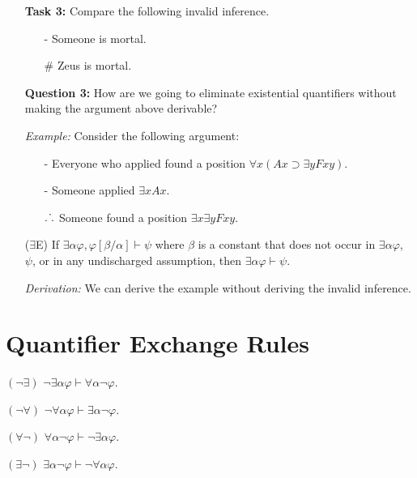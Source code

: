 \documentclass[a4paper, 11pt]{article} %
\def\therefore{\ensuremath{\ldotp\dot\,\ldotp}}
\newcommand{\qt}[2]{#1 #2} %
\newcommand{\unisub}[2]{[#1/#2]}
\begin{document}
\begin{enumerate}
  \item[\bf Task 3:] Compare the following invalid inference.
    \begin{itemize}
      \item[-] Someone is mortal.
      \item[$\#$] Zeus is mortal.
    \end{itemize}
  \item[\bf Question 3:] How are we going to eliminate existential quantifiers without making the argument above derivable?
  \item[\it Example:] Consider the following argument:
    \begin{itemize}
      \item[-] Everyone who applied found a position $\forall x(Ax \supset \exists y Fxy)$.
      \item[-] Someone applied $\exists xAx$.
      \item[$\therefore$] Someone found a position $\exists x\exists y Fxy$.
    \end{itemize}
  \item[($\exists$E)] If $\exists\alpha\varphi,\varphi\unisub{\beta}{\alpha} \vdash \psi$ where $\beta$ is a constant that does not occur in $\exists\alpha\varphi$, $\psi$, or in any undischarged assumption, then $\exists\alpha\varphi\vdash \psi$.
  \item[\it Derivation:] We can derive the example without deriving the invalid inference.
\end{enumerate}



\section*{Quantifier Exchange Rules}

\begin{enumerate}
  \begin{multicols}{2}
    \item[$(\neg\exists)$] $\neg\qt{\exists}{\alpha}\varphi \vdash \qt{\forall}{\alpha}\neg\varphi$.
    \item[$(\neg\forall)$] $\neg\qt{\forall}{\alpha}\varphi \vdash \qt{\exists}{\alpha}\neg\varphi$.
    \item[$(\forall\neg)$] $\qt{\forall}{\alpha}\neg\varphi \vdash \neg\qt{\exists}{\alpha}\varphi$.
    \item[$(\exists\neg)$] $\qt{\exists}{\alpha}\neg\varphi \vdash \neg\qt{\forall}{\alpha}\varphi$.
  \end{multicols}
\end{enumerate}
\end{document}
